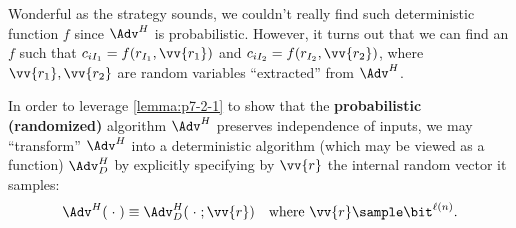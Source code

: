 \begin{answer}[ii]
    Wonderful as the strategy sounds,  we couldn't really find such deterministic function $f$ since $\Adv^H$ is probabilistic. However, it turns out that we can find an $f$ such that $c_{iI_1}=f(r_{I_1}, \vv{r_1})$ and $c_{iI_2}=f(r_{I_2}, \vv{r_2})$, where $\vv{r_1},\vv{r_2}$ are random variables ``extracted'' from $\Adv^H$.
    
    In order to leverage \autoref{lemma:p7-2-1} to show that the \textbf{probabilistic (randomized)} algorithm $\Adv^H$ preserves independence of inputs, we may ``transform'' $\Adv^H$ into a deterministic algorithm (which may be viewed as a function) $\Adv^H_D$ by explicitly specifying by $\vv{r}$ the internal random vector it samples:
    \begin{equation}\label{eq:p7-2-1}
        \Adv^H(\;\cdot\;) \equiv \Adv^H_D(\;\cdot\;; \vv{r})
        \quad \textrm{where } \vv{r}\sample\bit^{\ell(n)}. 
    \end{equation}


\end{answer}
